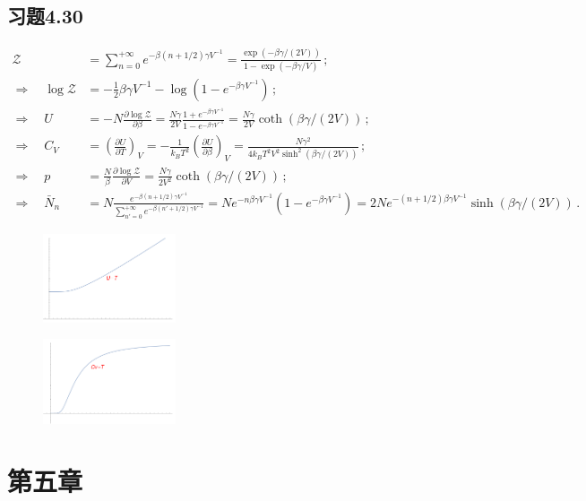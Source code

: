 \documentclass[letterpaper, 10pt]{article}
\begin{document}
\subsection{习题4.30}
\begin{align*}
\mathcal{Z} & = \sum_{n=0}^{+\infty} e^{-\beta(n+1/2)\gamma V^{-1}} = \frac{\exp{(-\beta\gamma/(2V))}}{1-\exp{(-\beta\gamma/V)}} \,; \\
\Rightarrow \quad{} \log{\mathcal{Z}} & = -\frac{1}{2} \beta\gamma V^{-1} - \log{\left(1-e^{-\beta\gamma V^{-1}}\right)} \,; \\
\Rightarrow \quad{} U & = - N \frac{\partial \log\mathcal{Z}}{\partial \beta} = \frac{N\gamma}{2V} \frac{1+e^{-\beta\gamma V^{-1}}}{1-e^{-\beta\gamma V^{-1}}} = \frac{N\gamma}{2V} \coth{(\beta\gamma/(2V))} \,; \\
\Rightarrow \quad{} C_{V} & = \left(\frac{\partial U}{\partial T}\right)_{V} = -\frac{1}{k_{B}T^{2}} \left(\frac{\partial U}{\partial \beta}\right)_{V} = \frac{N\gamma^{2}}{4k_{B}T^{2}V^{2}\sinh^{2}{(\beta\gamma/(2V))}} \,; \\
\Rightarrow \quad{} p & = \frac{N}{\beta} \frac{\partial \log\mathcal{Z}}{\partial V} = \frac{N\gamma}{2V^{2}} \coth{(\beta\gamma/(2V))} \,; \\
\Rightarrow \quad{} \bar{N}_{n} & = N \frac{e^{-\beta(n+1/2)\gamma V^{-1}}}{\sum_{n'=0}^{+\infty} e^{-\beta(n'+1/2)\gamma V^{-1}}} = N e^{-n\beta\gamma V^{-1}} \left( 1- e^{-\beta\gamma V^{-1}} \right) = 2 N e^{-(n+1/2)\beta\gamma V^{-1}} \sinh{(\beta\gamma/(2V))}\,.
\end{align*}
\begin{figure}[htbp]
\centering
\includegraphics[width=0.35\textwidth]{ut}
\end{figure}
\begin{figure}[htbp]
\centering
\includegraphics[width=0.35\textwidth]{cvt}
\end{figure}

\newpage
\section{第五章}
\end{document}
